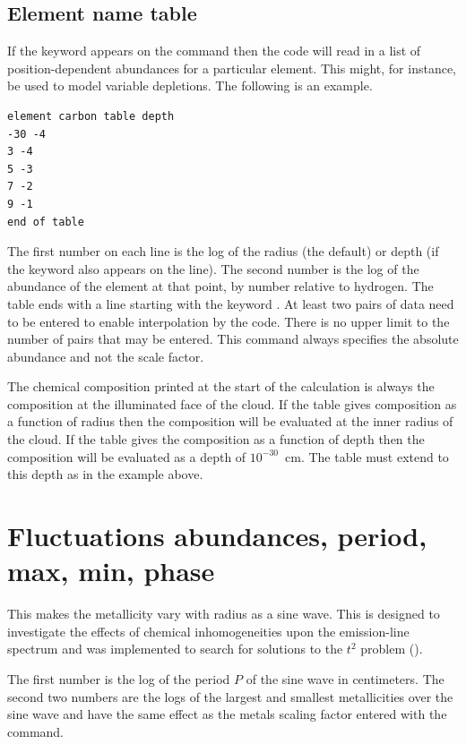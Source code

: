 \subsection{Element name table}

If the keyword  appears on
the  command then the code
will read in a list of position-dependent abundances for
a particular element.
This might, for instance, be used to model variable depletions.
The following is an example.
\begin{verbatim}
element carbon table depth
-30 -4
3 -4
5 -3
7 -2
9 -1
end of table
\end{verbatim}

The first number on each line is the log of the radius (the default)
or depth (if the keyword  also appears
on the  line).
The second number is the
log of the abundance of the element at that point, by number relative to
hydrogen.
The table ends with a line starting with the keyword
.
At least two pairs of data need to be entered to enable interpolation by the code.
There is no upper limit to the number of pairs that may be entered.
This command always specifies the absolute
abundance and not the scale factor.

The chemical composition printed at the start of the calculation is always
the composition at the illuminated face of the cloud.  If the table gives
composition as a function of radius then the composition will be evaluated
at the inner radius of the cloud.  If the table gives the composition as
a function of depth then the composition will be evaluated as a depth of
$10^{-30}$~cm.  The table must extend to this depth as in the example above.

\section{Fluctuations abundances, period, max, min, phase}
\label{sec:FluctuationsAbundanceCommand}

This makes the metallicity vary with radius as a sine wave.  This is
designed to investigate the effects of chemical inhomogeneities upon the
emission-line spectrum and was implemented to search for solutions to the
$t^2$ problem (\citealp{KingdonFerland1995}).

The first number is the log of the period $P$ of the sine wave in
centimeters.
The second two numbers are the logs of the largest and smallest
metallicities over the sine wave and have the same effect as the metals
scaling factor entered with the  command.

